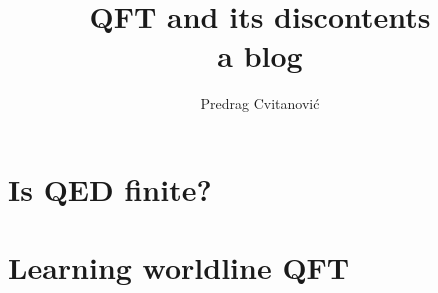 \documentclass[10pt,openany]{book}
\title{QFT and its discontents
       \\ \Huge a blog}
\author{Predrag Cvitanovi\'{c}}
\begin{document}
\maketitle

\tableofcontents




\chapter{Is QED finite?}
\label{c-finiteQED}

\newpage


\newpage
\printbibliography[heading=subbibintoc,title={References}]

\newpage
\chapter{Learning worldline QFT}


\newpage

\end{document}
